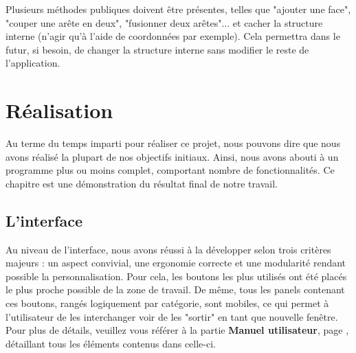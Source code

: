 \documentclass[a4paper]{memoir}
\begin{document}
				Plusieurs méthodes publiques doivent être présentes, telles que "ajouter une face", "couper une arête en deux", "fusionner deux arêtes"... 
				et cacher la structure interne (n'agir qu'à l'aide de coordonnées par exemple). Cela permettra dans le futur, si besoin, de changer la 
				structure interne sans modifier le reste de l'application.
		
	\chapter{Réalisation}
		Au terme du temps imparti pour réaliser ce projet, nous pouvons dire que nous avons réalisé la plupart de nos objectifs initiaux. Ainsi, nous avons 
		abouti à un programme plus ou moins complet, comportant nombre de fonctionnalités. Ce chapitre est une démonstration du résultat final de notre 
		travail.
		
		\section{L'interface}
			Au niveau de l'interface, nous avons réussi à la développer selon trois critères majeurs : un aspect convivial, une ergonomie correcte et une 
			modularité rendant possible la personnalisation. Pour cela, les boutons les plus utilisés ont été placés le plus proche possible de la zone de 
			travail. De même, tous les panels contenant ces boutons, rangés logiquement par catégorie, sont mobiles, ce qui permet à l'utilisateur de les 
			interchanger voir de les "sortir" en tant que nouvelle fenêtre. Pour plus de détails, veuillez vous référer à la partie 
			\textbf{Manuel utilisateur}, page \pageref{man-user}, détaillant tous les éléments contenus dans celle-ci.
			
\end{document}
